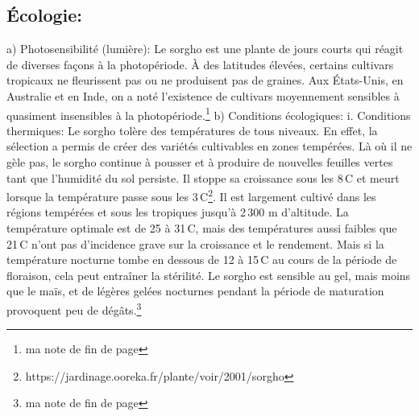 \documentclass[a4paper,11pt]{article}
\begin{document}
\subsection{Écologie:}
a) Photosensibilité (lumière): Le sorgho est une plante de jours
courts qui réagit de diverses façons à la photopériode. À des
latitudes élevées, certains cultivars tropicaux ne fleurissent pas ou
ne produisent pas de graines. Aux États-Unis, en Australie et en Inde,
on a noté l’existence de cultivars moyennement sensibles à quasiment
insensibles à la photopériode.\footnote{ma note de fin de page}
b) Conditions écologiques:
i. Conditions thermiques: Le sorgho tolère des
températures de tous niveaux. En effet, la sélection a permis de créer
des variétés cultivables en zones tempérées. Là où il ne gèle pas, le
sorgho continue à pousser et à produire de nouvelles feuilles vertes
tant que l’humidité du sol persiste. Il stoppe sa croissance sous les
8\,\degree{}C et meurt lorsque la température passe sous les
3\,\degree{}C\footnote{https://jardinage.ooreka.fr/plante/voir/2001/sorgho}. Il
est largement cultivé dans les régions tempérées et sous les tropiques
jusqu’à 2\,300 m d’altitude. La température optimale est de 25 à
31\,\degree{}C, mais des températures aussi faibles que 21\,\degree{}C
n’ont pas d’incidence grave sur la croissance et le rendement. Mais si
la température nocturne tombe en dessous de 12 à 15\,\degree{}C au
cours de la période de floraison, cela peut entraîner la stérilité. Le
sorgho est sensible au gel, mais moins que le maïs, et de légères
gelées nocturnes pendant la période de maturation provoquent peu de
dégâts.\footnote{ma note de fin de page}
\end{document}
